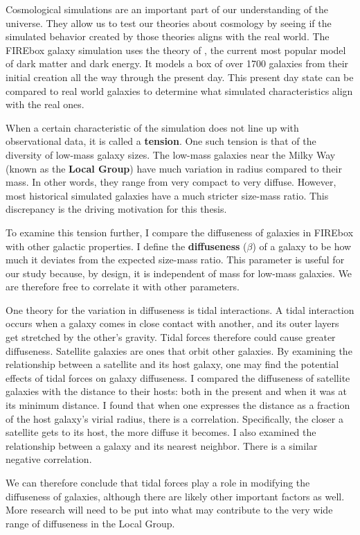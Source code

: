 
Cosmological simulations are an important part of our understanding of the universe. They allow us to test our theories about cosmology by seeing if the simulated behavior created by those theories aligns with the real world. The FIREbox galaxy simulation uses the theory of \textbf{\lcdm}, the current most popular model of dark matter and dark energy. It models a box of over 1700 galaxies from their initial creation all the way through the present day. This present day state can be compared to real world galaxies to determine what simulated characteristics align with the real ones.

When a certain characteristic of the simulation does not line up with observational data, it is called a \textbf{tension}. One such tension is that of the diversity of low-mass galaxy sizes. The low-mass galaxies near the Milky Way (known as the \textbf{Local Group}) have much variation in radius compared to their mass. In other words, they range from very compact to very diffuse. However, most historical simulated galaxies have a much stricter size-mass ratio. This discrepancy is the driving motivation for this thesis.

To examine this tension further, I compare the diffuseness of galaxies in FIREbox with other galactic properties. I define the \textbf{diffuseness} ($\beta$) of a galaxy to be how much it deviates from the expected size-mass ratio. This parameter is useful for our study because, by design, it is independent of mass for low-mass galaxies. We are therefore free to correlate it with other parameters.

One theory for the variation in diffuseness is tidal interactions. A tidal interaction occurs when a galaxy comes in close contact with another, and its outer layers get stretched by the other's gravity. Tidal forces therefore could cause greater diffuseness. Satellite galaxies are ones that orbit other galaxies. By examining the relationship between a satellite and its host galaxy, one may find the potential effects of tidal forces on galaxy diffuseness. I compared the diffuseness of satellite galaxies with the distance to their hosts: both in the present and when it was at its minimum distance. I found that when one expresses the distance as a fraction of the host galaxy's virial radius, there is a correlation. Specifically, the closer a satellite gets to its host, the more diffuse it becomes. I also examined the relationship between a galaxy and its nearest neighbor. There is a similar negative correlation.

We can therefore conclude that tidal forces play a role in modifying the diffuseness of galaxies, although there are likely other important factors as well. More research will need to be put into what may contribute to the very wide range of diffuseness in the Local Group.
